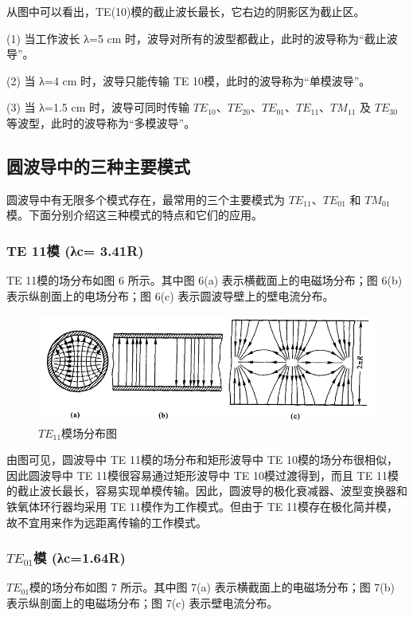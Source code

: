 从图中可以看出，TE({10})模的截止波长最长，它右边的阴影区为截止区。

(1) 当工作波长 λ=5 cm 时，波导对所有的波型都截止，此时的波导称为“截止波导”。

(2) 当 λ=4 cm 时，波导只能传输 TE 10​
模，此时的波导称为“单模波导”。

(3) 当 λ=1.5 cm 时，波导可同时传输 $TE_{10}$、$TE_{20}$、$TE_{01}$、$TE_{11} $、$TM_{11}$ 及 $TE_{30}$等波型，此时的波导称为“多模波导”。

\subsection{圆波导中的三种主要模式}
圆波导中有无限多个模式存在，最常用的三个主要模式为 $TE_{11} $、$ TE_{01}$ 和 $TM_{01}$模。下面分别介绍这三种模式的特点和它们的应用。

\subsubsection{TE 11模 (λc= 3.41R)}

TE 11​模的场分布如图 6 所示。其中图 6(a) 表示横截面上的电磁场分布；图 6(b) 表示纵剖面上的电场分布；图 6(c) 表示圆波导壁上的壁电流分布。

\begin{figure}[htbp]
	\centering
	\includegraphics[width=0.7\linewidth]{img/3-6-1}
	\caption{$TE_{11}$模场分布图}
	\label{fig:3-6-1}
\end{figure}

由图可见，圆波导中 TE 11​模的场分布和矩形波导中 TE 10​模的场分布很相似，因此圆波导中 TE 11​模很容易通过矩形波导中 TE 10​模过渡得到，而且 TE 11​模的截止波长最长，容易实现单模传输。因此，圆波导的极化衰减器、波型变换器和铁氧体环行器均采用 TE 11​模作为工作模式。但由于 TE 11​模存在极化简并模，故不宜用来作为远距离传输的工作模式。

\subsubsection{ $TE_{01}$模 (λc=1.64R)}

$TE_{01}$模的场分布如图 7 所示。其中图 7(a) 表示横截面上的电磁场分布；图 7(b) 表示纵剖面上的电磁场分布；图 7(c) 表示壁电流分布。

